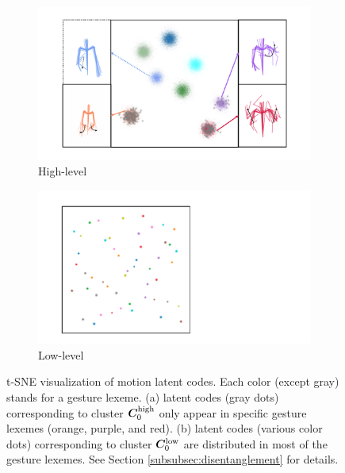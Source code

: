 \begin{figure}[t]
    \centering
    \begin{subfigure}[t]{0.62\linewidth}
        \centering
        \includegraphics[width=\linewidth]{figures/fig14a.pdf}
        \caption{High-level}
        \label{fig:fig14a}
    \end{subfigure} 
    \hspace{\fill}
    \begin{subfigure}[t]{0.3554\linewidth}
        \centering
        \includegraphics[width=\linewidth]{figures/fig14b.pdf}
        \caption{Low-level}
        \label{fig:fig14b}
    \end{subfigure} 
    \caption{t-SNE visualization of motion latent codes. Each color (except gray) stands for a gesture lexeme. 
    (a) latent codes (gray dots) corresponding to cluster $\bm{C}^{{\text{high}}}_0$ only appear in specific gesture lexemes (orange, purple, and red).
    (b) latent codes (various color dots) corresponding to cluster $\bm{C}^{{\text{low}}}_0$ are distributed in most of the gesture lexemes.
    See Section \ref{subsubsec:disentanglement} for details.}
    \label{fig:fig14}
    \Description{}
\end{figure}

